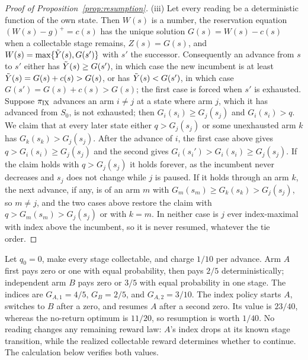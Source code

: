 \begin{proof}[Proof of Proposition~\ref{prop:resumption}]
(iii) Let every reading be a deterministic function of the own state. Then
$W(s)$ is a number, the reservation equation $(W(s)-g)^+=c(s)$ has the unique
solution $G(s)=W(s)-c(s)$ when a collectable stage remains, $Z(s)=G(s)$, and
$W(s)=\max\{\tilde Y(s),G(s')\}$ with $s'$ the successor. Consequently an advance
from $s$ to $s'$ either has $\tilde Y(s)\ge G(s')$, in which case the new incumbent
is at least $\tilde Y(s)=G(s)+c(s)>G(s)$, or has $\tilde Y(s)<G(s')$, in which case
$G(s')=G(s)+c(s)>G(s)$; the first case is forced when $s'$ is exhausted.
Suppose $\pi_{\rm IX}$ advances an arm $i\ne j$ at a state where arm $j$, which it has advanced from $S_0$, is not exhausted; then $G_i(s_i)\ge G_j(s_j)$ and $G_i(s_i)>q$.
We claim that at every later state either $q>G_j(s_j)$ or some unexhausted
arm $k$ has $G_k(s_k)>G_j(s_j)$. After the advance of $i$, the first case
above gives $q>G_i(s_i)\ge G_j(s_j)$ and the second gives
$G_i(s_i')>G_i(s_i)\ge G_j(s_j)$. If the claim holds with $q>G_j(s_j)$ it holds
forever, as the incumbent never decreases and $s_j$ does not change while $j$
is paused. If it holds through an arm $k$, the next advance, if any, is of an
arm $m$ with $G_m(s_m)\ge G_k(s_k)>G_j(s_j)$, so $m\ne j$, and the two cases
above restore the claim with $q>G_m(s_m)>G_j(s_j)$ or with $k=m$. In neither
case is $j$ ever index-maximal with index above the incumbent, so it is never
resumed, whatever the tie order.
\end{proof}

\begin{example}\label{ex:resumption-reward}
Let $q_0=0$, make every stage collectable, and charge $1/10$ per advance.
Arm $A$ first pays zero or one with equal probability, then pays $2/5$
deterministically; independent arm $B$ pays zero or $3/5$ with equal probability
in one stage. The indices are $G_{A,1}=4/5$, $G_B=2/5$, and $G_{A,2}=3/10$.
The index policy starts $A$, switches to $B$ after a zero, and resumes $A$ after
a second zero. Its value is $23/40$, whereas the no-return optimum is $11/20$,
so resumption is worth $1/40$. No reading changes any remaining reward law:
$A$'s index drops at its known stage transition, while the realized collectable
reward determines whether to continue. The calculation below verifies both values.
\end{example}

